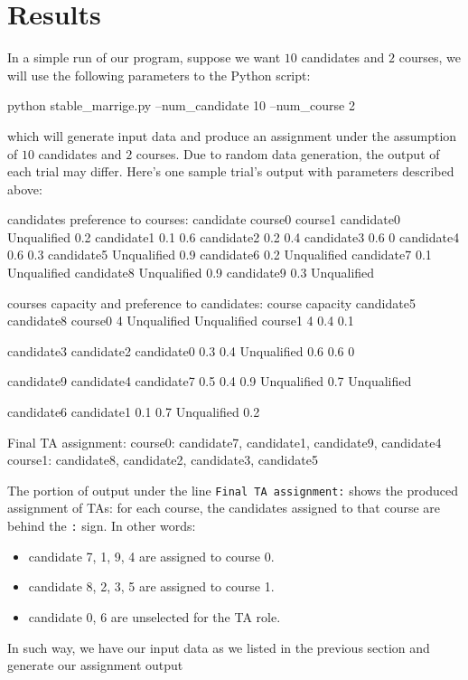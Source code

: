 \documentclass[twoside,twocolumn]{article}
\begin{document}
    \section{Results}
    \indent In a simple run of our program, suppose we want $10$ candidates and $2$ courses, we will use the following parameters to
    the Python script:
\begin{spverbatim}
    python stable_marrige.py --num_candidate 10 --num_course 2
\end{spverbatim}
    which will generate input data and produce an assignment under the assumption of $10$ candidates and $2$ courses. Due to
    random data generation, the output of each trial may differ. Here's one sample trial's output with parameters described above:
\begin{spverbatim}
candidates preference to courses:
candidate      course0      course1
candidate0  Unqualified          0.2
candidate1          0.1          0.6
candidate2          0.2          0.4
candidate3          0.6            0
candidate4          0.6          0.3
candidate5  Unqualified          0.9
candidate6          0.2  Unqualified
candidate7          0.1  Unqualified
candidate8  Unqualified          0.9
candidate9          0.3  Unqualified

courses capacity and preference to candidates:
course capacity   candidate5   candidate8   
course0        4  Unqualified  Unqualified         
course1        4          0.4          0.1         

candidate3  candidate2  candidate0 
       0.3         0.4  Unqualified
       0.6         0.6           0 

candidate9  candidate4   candidate7   
        0.5        0.4         0.9 
Unqualified        0.7  Unqualified 

candidate6  candidate1
0.1                0.7
Unqualified        0.2

Final TA assignment:
course0: candidate7, candidate1, candidate9, candidate4
course1: candidate8, candidate2, candidate3, candidate5
\end{spverbatim}
    The portion of output under the line \verb|Final TA assignment:| shows the produced assignment of TAs: for each course,
    the candidates assigned to that course are behind the \verb|:| sign. In other words:
    \begin{itemize}
        \item candidate 7, 1, 9, 4 are assigned to course 0.
        \item candidate 8, 2, 3, 5 are assigned to course 1.
        \item candidate 0, 6 are unselected for the TA role.
    \end{itemize}
    In such way, we have our input data as we listed in the previous section and generate our assignment output
\end{document}
